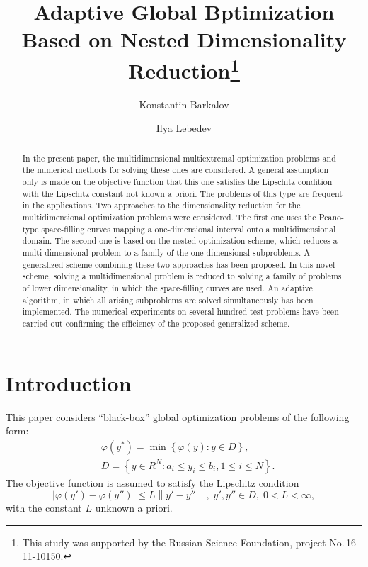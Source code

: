 \documentclass[runningheads]{llncs}
\begin{document}
%
\title{Adaptive Global Bptimization Based on Nested Dimensionality 
Reduction\thanks{This study was supported by the Russian Science Foundation, 
project No.\,16-11-10150.}}
%
%
\author{Konstantin Barkalov %
\and Ilya Lebedev %
}
%
%
%
\maketitle              %
%
\begin{abstract}

In the present paper, the multidimensional multiextremal optimization 
problems and the numerical methods for solving these ones are considered. A 
general assumption only is made on the objective function that this one 
satisfies the Lipschitz condition with the Lipschitz constant not known 
a priori. The problems of this type are frequent in the applications. 
Two approaches to the dimensionality reduction for the multidimensional 
optimization problems were considered. The first one uses the Peano-type 
space-filling curves mapping a one-dimensional interval onto a multidimensional 
domain. The second one is based on the nested optimization scheme, which 
reduces a multi-dimensional problem to a family of the one-dimensional 
subproblems. A generalized scheme combining these two approaches has been 
proposed. In this novel scheme, solving a multidimensional problem is 
reduced to solving a family of problems of lower dimensionality, in 
which the space-filling curves are used. An adaptive algorithm, in which all 
arising subproblems are solved simultaneously has been implemented. The 
numerical experiments on several hundred test problems have been carried out 
confirming the efficiency of the proposed generalized scheme.

\end{abstract}
%
%
%
\section{Introduction}
This paper considers ``black-box'' global optimization problems of the 
following form:
\begin{eqnarray}\label{main_problem}
& \varphi(y^\ast)=\min{\left\{\varphi(y):y\in D\right\}},\\
& D=\left\{y\in R^N: a_i\leq y_i \leq b_i, 1\leq i \leq N\right\}. \nonumber
\end{eqnarray}
The objective function is assumed to satisfy the Lipschitz condition 
\[
\left|\varphi(y')-\varphi(y'')\right|\leq L\left\|y'-y''\right\|,\; y',y'' \in
 D,\; 0<L<\infty,
\]
with the constant $L$ unknown a priori.
\end{document}
